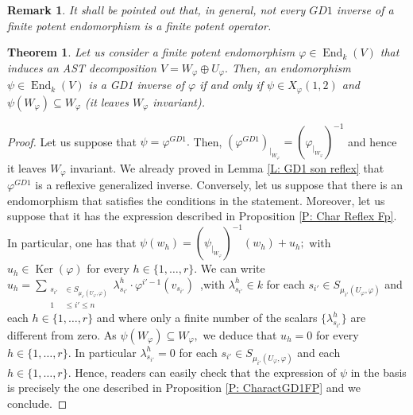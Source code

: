 \documentclass[10pt,a4paper]{amsart}
\newtheorem{thm}[defn]{Theorem}
\theoremstyle{plain}
\newtheorem{rem}[defn]{Remark}
\theoremstyle{remark}
\numberwithin{equation}{section} \numberwithin{defn}{section}
\newcommand\ed{\operatorname{End}}
\newcommand\Ker{\operatorname{Ker}}
\newcommand{\f}{\varphi}
\newcommand{\g}{\psi}
\begin{document}
\begin{rem}
It shall be pointed out that, in general, not every $GD1$ inverse of a finite potent endomorphism is a finite potent operator.
\end{rem}


\begin{thm}\label{T: Caract GD1 INV AST}
Let us consider a finite potent endomorphism $\f \in \ed_k(V)$ that induces an AST decomposition $V=W_{\f}\oplus U_{\f}.$ Then, an endomorphism $\g\in \ed_k(V)$ is a GD1 inverse of $\f$ if and only if $\g\in X_{\f}(1,2)$ and $\g(W_{\f})\subseteq W_{\f}$ (it leaves $W_{\f}$ invariant).
\end{thm}
\begin{proof}
Let us suppose that $\g=\f^{GD1}.$ Then, $(\f^{GD1})_{\vert_ {W_{\f}}}=(\f_{\vert_{W_{\f}}})^{-1}$ and hence it leaves $W_{\f}$ invariant. We already proved in Lemma \ref{L: GD1 son reflex} that $\f^{GD1}$ is a reflexive generalized inverse. Conversely, let us suppose that there is an endomorphism that satisfies the conditions in the statement. Moreover, let us suppose that it has the expression described in Proposition \ref{P: Char Reflex Fp}. In particular, one has that $\g(w_h)=(\g_{\vert_{W_\varphi}})^{-1} (w_h) + u_h;$ with $u_h \in \Ker(\f)$ for every $h\in \{ 1,\dots ,r\}.$ We can write $u_h=\underset {\begin{aligned} s_{i'} &\in S_{{\mu}_{i'} (U_\varphi, \varphi)} \\ 1 &\leq i' \leq n \end{aligned}} \sum \lambda_{s_{i'}}^h\cdot \varphi^{i'-1} ({ {v_{s_{i'}}}})\,$ ,\noindent with $\lambda_{s_{i'}}^h\in k$ for each $s_{i'} \in S_{{\mu}_{i'} (U_\varphi, \varphi)}$ and each $h\in \{1, \dots, r\}$ and where only a finite number of the scalars $\{\lambda_{s_{i'}}^h\}$ are different from zero. As $\g(W_{\f})\subseteq W_{\f},$ we deduce that $u_h=0$ for every $h\in \{1,\dots,r \}.$ In particular $\lambda_{s_{i'}}^h=0$ for each $s_{i'} \in S_{{\mu}_{i'} (U_\varphi, \varphi)}$ and each $h\in \{1, \dots, r\}.$ Hence, readers can easily check that the expression of $\g$ in the basis is precisely the one described in Proposition \ref{P: CharactGD1FP} and we conclude.
\end{proof}
\end{document}
